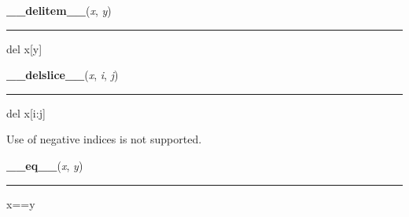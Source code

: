     \vspace{0.5ex}

    \begin{boxedminipage}{\textwidth}

    \raggedright \textbf{\_\_delitem\_\_}(\textit{x}, \textit{y})

    \vspace{-1.5ex}

    \rule{\textwidth}{0.5\fboxrule}

del x{[}y{]}
    \vspace{1ex}

    \end{boxedminipage}

    \label{list:__delslice__}

    \vspace{0.5ex}

    \begin{boxedminipage}{\textwidth}

    \raggedright \textbf{\_\_delslice\_\_}(\textit{x}, \textit{i}, \textit{j})

    \vspace{-1.5ex}

    \rule{\textwidth}{0.5\fboxrule}

del x{[}i:j{]}

Use of negative indices is not supported.
    \vspace{1ex}

    \end{boxedminipage}

    \label{list:__eq__}

    \vspace{0.5ex}

    \begin{boxedminipage}{\textwidth}

    \raggedright \textbf{\_\_eq\_\_}(\textit{x}, \textit{y})

    \vspace{-1.5ex}

    \rule{\textwidth}{0.5\fboxrule}

x==y
    \vspace{1ex}

    \end{boxedminipage}

    \label{list:__ge__}

    \vspace{0.5ex}

